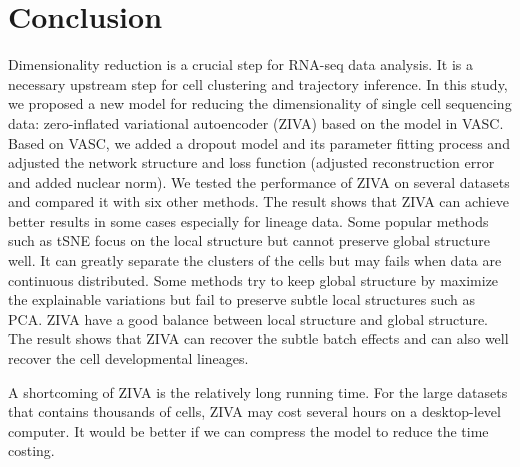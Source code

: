 \section{Conclusion}
Dimensionality reduction is a crucial step for RNA-seq data analysis. It is a necessary upstream step for cell clustering and trajectory inference. In this study, we proposed a new model for reducing the dimensionality of single cell sequencing data: zero-inflated variational autoencoder (ZIVA) based on the model in VASC. Based on VASC, we added a dropout model and its parameter fitting process and adjusted the network structure and loss function (adjusted reconstruction error and added nuclear norm). We tested the performance of ZIVA on several datasets and compared it with six other methods. The result shows that ZIVA can achieve better results in some cases especially for lineage data. Some popular methods such as tSNE focus on the local structure but cannot preserve global structure well. It can greatly separate the clusters of the cells but may fails when data are continuous distributed. Some methods try to keep global structure by maximize the explainable variations but fail to preserve subtle local structures such as PCA. ZIVA have a good balance between local structure and global structure. The result shows that ZIVA can recover the subtle batch effects and can also well recover the cell developmental lineages.

A shortcoming of ZIVA is the relatively long running time. For the large datasets that contains thousands of cells, ZIVA may cost several hours on a desktop-level computer. It would be better if we can compress the model to reduce the time costing.

